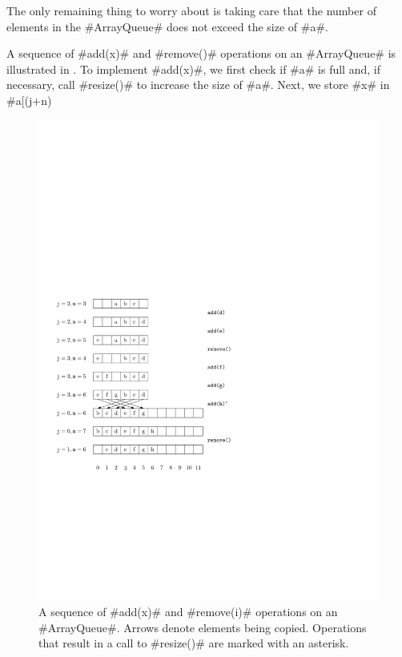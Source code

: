 The only remaining thing to worry about is taking care that the number
of elements in the #ArrayQueue# does not exceed the size of #a#.


A sequence of #add(x)# and #remove()# operations on an #ArrayQueue# is
illustrated in .  To implement #add(x)#, we first
check if #a# is full and, if necessary, call #resize()# to increase
the size of #a#.  Next, we store #x# in
#a[(j+n)%

\begin{figure}
  \begin{center}
    \includegraphics{figs/arrayqueue}
  \end{center}
  \caption{A sequence of #add(x)# and #remove(i)# operations on an
  #ArrayQueue#.  Arrows denote elements being copied.  Operations that
  result in a call to #resize()# are marked with an asterisk.}
\end{figure}



